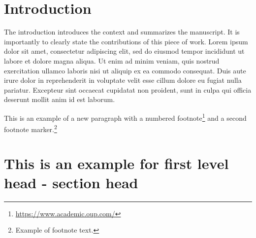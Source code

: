 \documentclass[unnumsec,webpdf,contemporary,large]{oup-authoring-template}%
\theoremstyle{thmstyleone}%
\theoremstyle{thmstyletwo}%
\theoremstyle{thmstylethree}%
\begin{document}



\maketitle


\section{Introduction}
The introduction introduces the context and summarizes the manuscript. It is importantly to clearly state the contributions
of this piece of work. Lorem ipsum dolor sit amet, consectetur adipiscing elit, sed do eiusmod tempor incididunt ut labore et dolore magna aliqua. Ut enim ad minim veniam, quis nostrud exercitation ullamco laboris nisi ut aliquip ex ea commodo consequat. Duis aute irure dolor in reprehenderit in voluptate velit esse cillum dolore eu fugiat nulla pariatur. Excepteur sint occaecat cupidatat non proident, sunt in culpa qui officia deserunt mollit anim id est laborum.

This is an example of a new paragraph with a numbered footnote\footnote{\url{https://www.academic.oup.com/}} and a second footnote marker.\footnote{Example of footnote text.}



\section{This is an example for first level head - section head}\label{sec2}
\end{document}
